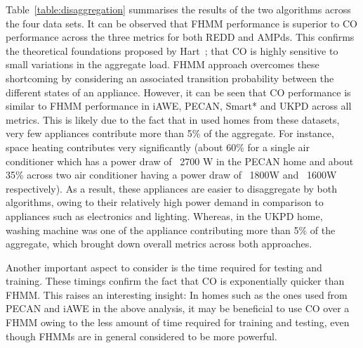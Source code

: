 \documentclass{sig-alternate}
\newcommand{\tabref}[1]{Table~\ref{#1}}
\begin{document}
\tabref{table:disaggregation} summarises the results of the two algorithms across the four data sets. It can be observed that FHMM performance is superior to CO performance across the three metrics for both REDD and AMPds. This confirms the theoretical foundations proposed by Hart~\cite{hart_1992}; that CO is highly sensitive to small variations in the aggregate load. FHMM approach overcomes these shortcoming by considering an associated transition probability between the different states of an appliance. However, it can be seen that CO performance is similar to FHMM performance in iAWE, PECAN, Smart* and UKPD across all metrics. This is likely due to the fact that in used homes from these datasets, very few appliances contribute more than 5\% of the aggregate. For instance, space heating contributes very significantly (about 60\% for a single air conditioner which has a power draw of ~2700 W in the PECAN home and about 35\% across two air conditioner having a power draw of ~1800W and ~1600W respectively). As a result, these appliances are easier to disaggregate by both algorithms, owing to their relatively high power demand in comparison to appliances such as electronics and lighting. Whereas, in the UKPD home, washing machine was one of the appliance contributing more than 5\% of the aggregate, which brought down overall metrics across both approaches. 

Another important aspect to consider is the time required for testing and training. These timings confirm the fact that CO is exponentially quicker than FHMM. This raises an interesting insight: In homes such as the ones used from PECAN and iAWE in the above analysis, it may be beneficial to use CO over a FHMM owing to the less amount of time required for training and testing, even though FHMMs are in general considered to be more powerful.
\end{document}
